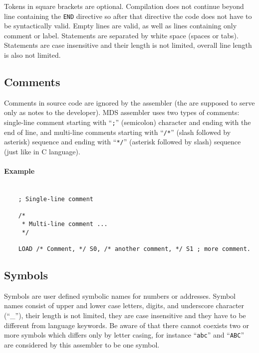         Tokens in square brackets are optional. Compilation does not continue beyond line containing the \texttt{END} directive so after that directive the code does not have to be syntactically valid. Empty lines are valid, as well as lines containing only comment or label. Statements are separated by white space (spaces or tabs). Statements are case insensitive and their length is not limited, overall line length is also not limited.

    \subsection{Comments}
        Comments in source code are ignored by the assembler (the are supposed to serve only as notes to the developer). MDS assembler uses two types of comments: single-line comment starting with ``\texttt{;}'' (semicolon) character and ending with the end of line, and multi-line comments starting with ``\texttt{/*}'' (slash followed by asterisk) sequence and ending with ``\texttt{*/}'' (asterisk followed by slash) sequence (just like in C language).

        \paragraph{Example}
            ~\\
            \verb'    ; Single-line comment'\\
            \verb'    '\\
            \verb'    /*'\\
            \verb'     * Multi-line comment ...'\\
            \verb'     */'\\
            \verb'    '\\
            \verb'    LOAD /* Comment, */ S0, /* another comment, */ S1 ; more comment.'

    \subsection{Symbols}
        Symbols are user defined symbolic names for numbers or addresses. Symbol names consist of upper and lower case letters, digits, and underscore character (``\_''), their length is not limited, they are case insensitive and they have to be different from language keywords. Be aware of that there cannot coexists two or more symbols which differs only by letter casing, for instance ``\texttt{abc}'' and ``\texttt{ABC}'' are considered by this assembler to be one symbol.

